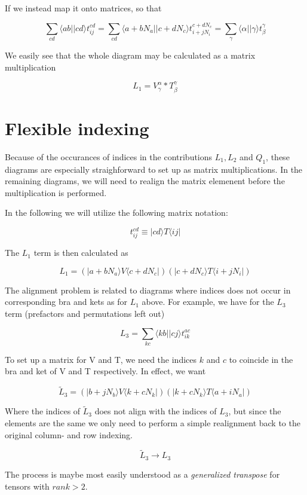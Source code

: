 \documentclass{article}
\begin{document}
If we instead map it onto matrices, so that

\[\sum_{cd} \langle ab \vert \vert cd \rangle t^{cd}_{ij} = \sum_{cd} \langle a+ bN_a \vert \vert c+dN_c \rangle t^{c+dN_c}_{i+jN_i} = \sum_{\gamma} \langle \alpha \vert \vert \gamma \rangle t^{\gamma}_{\beta}\]

We easily see that the whole diagram may be calculated as a matrix
multiplication

\[L_1 = V^{\alpha}_\gamma * T^\gamma_\beta\]

    \section{Flexible indexing}\label{flexible-indexing}

Because of the occurances of indices in the contributions \(L_1, L_2\)
and \(Q_1\), these diagrams are especially straighforward to set up as
matrix multiplications. In the remaining diagrams, we will need to
realign the matrix elemenent before the multiplication is performed.

In the following we will utilize the following matrix notation:

\[t^{cd}_{ij} \equiv | cd \rangle T \langle ij |\]

The \(L_1\) term is then calculated as

\[L_1 = (| a + bN_a\rangle V \langle c + dN_c | )( | c + dN_c \rangle T \langle i + jN_i|) \]

The alignment problem is related to diagrams where indices does not
occur in corresponding bra and kets as for \(L_1\) above. For example,
we have for the \(L_3\) term (prefactors and permutations left out)

\[L_3 = \sum_{kc} \langle kb \vert \vert cj \rangle t^{ac}_{ik} \]

To set up a matrix for V and T, we need the indices \(k\) and \(c\) to
coincide in the bra and ket of V and T respectively. In effect, we want

\[\tilde{L}_3 =   (| b + jN_b\rangle V \langle k + cN_k | )( | k + cN_k \rangle T \langle a + iN_a|) \]

Where the indices of \(\tilde{L}_3\) does not align with the indices of
\(L_3\), but since the elements are the same we only need to perform a
simple realignment back to the original column- and row indexing.

\[\tilde{L}_3 \rightarrow L_3\]

The process is maybe most easily understood as a \emph{generalized
transpose} for tensors with \(rank>2\).
\end{document}
